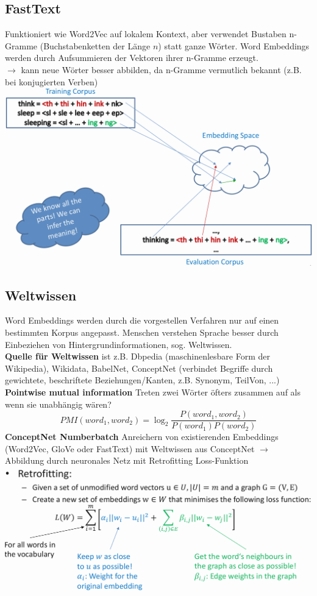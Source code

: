 \documentclass[12pt]{article}
\begin{document}
	\subsection{FastText}
	Funktioniert wie Word2Vec auf lokalem Kontext, aber verwendet Bustaben n-Gramme (Buchstabenketten der Länge $n$) statt ganze Wörter. Word Embeddings werden durch Aufsummieren der Vektoren ihrer n-Gramme erzeugt.\\
	$\rightarrow$ kann neue Wörter besser abbilden, da n-Gramme vermutlich bekannt (z.B. bei konjugierten Verben)\\
	\includegraphics[width=\linewidth]{figures/fasttext.png}

	\subsection{Weltwissen}
	Word Embeddings werden durch die vorgestellen Verfahren nur auf einen bestimmten Korpus angepasst. Menschen verstehen Sprache besser durch Einbeziehen von Hintergrundinformationen, sog. Weltwissen.\\
	\textbf{Quelle für Weltwissen} ist z.B. Dbpedia (maschinenlesbare Form der Wikipedia), Wikidata, BabelNet, ConceptNet (verbindet Begriffe durch gewichtete, beschriftete Beziehungen/Kanten, z.B. Synonym, TeilVon, ...)\\
	\textbf{Pointwise mutual information} Treten zwei Wörter öfters zusammen auf als wenn sie unabhängig wären?
	$$PMI(word_1, word_2) = \log_2 \frac{P(word_1, word_2)}{P(word_1)P(word_2)}$$
	\textbf{ConceptNet Numberbatch} Anreichern von existierenden Embeddings (Word2Vec, GloVe oder FastText) mit Weltwissen aus ConceptNet $\rightarrow$ Abbildung durch neuronales Netz mit Retrofitting Loss-Funktion\\
	\includegraphics[width=\linewidth]{figures/retrofitting.png}
\end{document}
